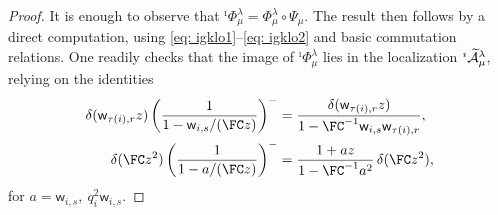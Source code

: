 \documentclass[reqno]{amsart}
\numberwithin{equation}{section}
\begin{document}
\begin{proof}
	It is enough to observe that ${}^\imath{\Phi}^{\lambda}_\mu = {\Phi}^{\lambda}_\mu \circ 
	\Psi_\mu$. The result then follows by a direct computation, using 
	\eqref{eq: igklo1}--\eqref{eq: igklo2} and basic commutation relations. One readily 
	checks that the image of ${}^\imath{\Phi}^{\lambda}_\mu$ lies in the localization 
	${}^\imath\widetilde{\mathcal{A}}^\lambda_\mu$, relying on the identities
	\begin{align}
		\delta(\mathsf w_{\tau(i),r}z)
		\left(\frac{1}{1-\mathsf w_{i,s}/(\FC z)}\right)^-
		&= 
		\frac{\delta(\mathsf w_{\tau(i),r}z)}
		{1-\FC^{-1}\mathsf w_{i,s}\mathsf w_{\tau(i),r}}, \\ 
		\delta(\FC z^2)
		\left(\frac{1}{1-a/(\FC z)}\right)^-
		&=
		\frac{1+az}{1-\FC^{-1} a^2}\,\delta(\FC z^2), 
	\end{align}
	for $a=\mathsf w_{i,s}, \ q_i^2\mathsf w_{i,s}$.
\end{proof} 
\end{document}
